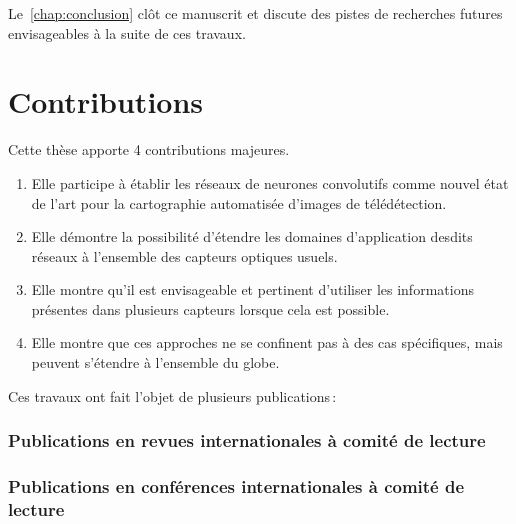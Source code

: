 Le~\cref{chap:conclusion} clôt ce manuscrit et discute des pistes de recherches futures envisageables à la suite de ces travaux.

\section{Contributions}

Cette thèse apporte 4 contributions majeures.
\begin{enumerate}
  \item Elle participe à établir les réseaux de neurones convolutifs comme nouvel état de l'art pour la cartographie automatisée d'images de télédétection.
  \item Elle démontre la possibilité d'étendre les domaines d'application desdits réseaux à l'ensemble des capteurs optiques usuels.
  \item Elle montre qu'il est envisageable et pertinent d'utiliser les informations présentes dans plusieurs capteurs lorsque cela est possible.
  \item Elle montre que ces approches ne se confinent pas à des cas spécifiques, mais peuvent s'étendre à l'ensemble du globe.
\end{enumerate}

Ces travaux ont fait l'objet de plusieurs publications\,:

\subsubsection*{Publications en revues internationales à comité de lecture}




\subsubsection*{Publications en conférences internationales à comité de lecture}







\medskip



%
%
